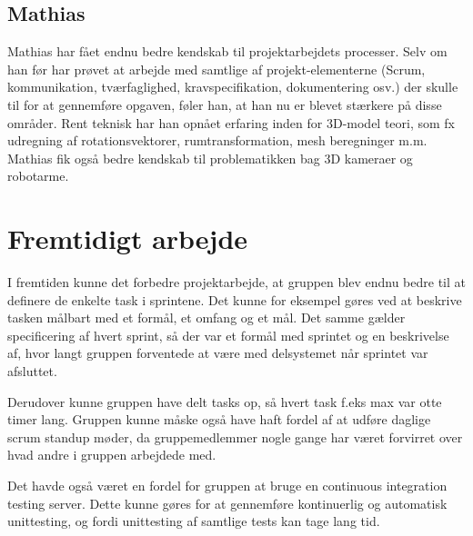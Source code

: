 \subsection{Mathias}
Mathias har fået endnu bedre kendskab til projektarbejdets processer. Selv om han før har prøvet at arbejde med samtlige af projekt-elementerne (Scrum, kommunikation, tværfaglighed, kravspecifikation, dokumentering osv.) der skulle til for at gennemføre opgaven, føler han, at han nu er blevet stærkere på disse områder. Rent teknisk har han opnået erfaring inden for 3D-model teori, som fx udregning af rotationsvektorer, rumtransformation, mesh beregninger m.m. Mathias fik også bedre kendskab til problematikken bag 3D kameraer og robotarme.

\section{Fremtidigt arbejde}
I fremtiden kunne det forbedre projektarbejde, at gruppen blev endnu bedre til at definere de enkelte task i sprintene. Det kunne for eksempel gøres ved at beskrive tasken målbart med et formål, et omfang og et mål. Det samme gælder specificering af hvert sprint, så der var et formål med sprintet og en beskrivelse af, hvor langt gruppen forventede at være med delsystemet når sprintet var afsluttet.

Derudover kunne gruppen have delt tasks op, så hvert task f.eks max var otte timer lang. Gruppen kunne måske også have haft fordel af at udføre daglige scrum standup møder, da gruppemedlemmer nogle gange har været forvirret over hvad andre i gruppen arbejdede med.

Det havde også været en fordel for gruppen at bruge en continuous integration testing server. Dette kunne gøres for at gennemføre kontinuerlig og automatisk unittesting, og fordi unittesting af samtlige tests kan tage lang tid.